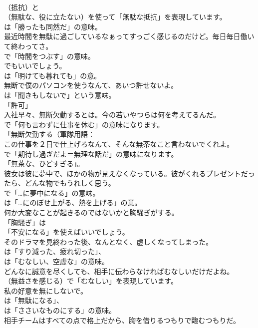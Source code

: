 \documentclass[8pt]{extreport}
\begin{document}
\begin{CJK}{UTF8}{min}
\\	（抵抗）と 
\\	（無駄な、役に立たない）を使って「無駄な抵抗」を表現しています。
\\	は「勝ったも同然だ」の意味。	
\\	最近時間を無駄に過ごしているなぁってすっごく感じるのだけど。毎日毎日働いて終わってさ。 
\\	で「時間をつぶす」の意味。
\\	でもいいでしょう。
\\	は「明けても暮れても」の意。	
\\	無断で僕のパソコンを使うなんて、あいつ許せないよ。 
\\	は「聞きもしないで」という意味。
\\	「許可」	
\\	入社早々、無断欠勤するとは。今の若いやつらは何を考えてるんだ。 
\\	で「何も言わずに仕事を休む」の意味になります。
\\	「無断欠勤する（軍隊用語：
\\	この仕事を２日で仕上げろなんて、そんな無茶なこと言わないでくれよ。 
\\	で「期待し過ぎだよ＝無理な話だ」の意味になります。
\\	「無茶な、ひどすぎる」。	
\\	彼女は彼に夢中で、ほかの物が見えなくなっている。彼がくれるプレゼントだったら、どんな物でもうれしく思う。 
\\	で「…に夢中になる」の意味。
\\	は「…にのぼせ上がる、熱を上げる」の意。	
\\	何か大変なことが起きるのではないかと胸騒ぎがする。 
\\	「胸騒ぎ」は
\\	「不安になる」を使えばいいでしょう。	
\\	そのドラマを見終わった後、なんとなく、虚しくなってしまった。 
\\	は「すり減った、疲れ切った」、
\\	は「むなしい、空虚な」の意味。	
\\	どんなに誠意を尽くしても、相手に伝わらなければむなしいだけだよね。 
\\	（無益さを感じる）で「むなしい」を表現しています。	
\\	私の好意を無にしないで。 
\\	は「無駄になる」、
\\	は「ささいなものにする」の意味。	
\\	相手チームはすべての点で格上だから、胸を借りるつもりで臨むつもりだ。 

\end{CJK}
\end{document}
